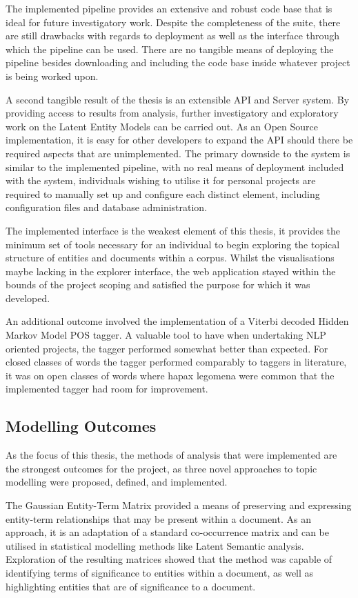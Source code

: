 \documentclass[10pt]{report}
\begin{document}
The implemented pipeline provides an extensive and robust code base that is ideal for future investigatory work. Despite the completeness of the suite, there are still drawbacks with regards to deployment as well as the interface through which the pipeline can be used. There are no tangible means of deploying the pipeline besides downloading and including the code base inside whatever project is being worked upon.

A second tangible result of the thesis is an extensible API and Server system. By providing access to results from analysis, further investigatory and exploratory work on the Latent Entity Models can be carried out. As an Open Source implementation, it is easy for other developers to expand the API should there be required aspects that are unimplemented. The primary downside to the system is similar to the implemented pipeline, with no real means of deployment included with the system, individuals wishing to utilise it for personal projects are required to manually set up and configure each distinct element, including configuration files and database administration.

The implemented interface is the weakest element of this thesis, it provides the minimum set of tools necessary for an individual to begin exploring the topical structure of entities and documents within a corpus. Whilst the visualisations maybe lacking in the explorer interface, the web application stayed within the bounds of the project scoping and satisfied the purpose for which it was developed.

An additional outcome involved the implementation of a Viterbi decoded Hidden Markov Model POS tagger. A valuable tool to have when undertaking NLP oriented projects, the tagger performed somewhat better than expected. For closed classes of words the tagger performed comparably to taggers in literature, it was on open classes of words where hapax legomena were common that the implemented tagger had room for improvement.

\subsection{Modelling Outcomes}
As the focus of this thesis, the methods of analysis that were implemented are the strongest outcomes for the project, as three novel approaches to topic modelling were proposed, defined, and implemented.

The Gaussian Entity-Term Matrix provided a means of preserving and expressing entity-term relationships that may be present within a document. As an approach, it is an adaptation of a standard co-occurrence matrix and can be utilised in statistical modelling methods like Latent Semantic analysis. Exploration of the resulting matrices showed that the method was capable of identifying terms of significance to entities within a document, as well as highlighting entities that are of significance to a document.
\end{document}

